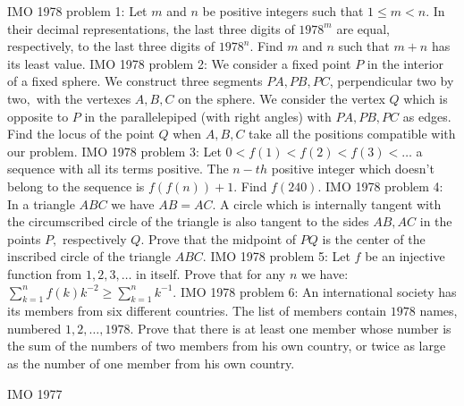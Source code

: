 IMO 1978 problem 1:  Let $ m$ and $ n$ be positive integers such that $ 1 \le m < n$.  In their decimal representations, the last three digits of $ 1978^m$ are equal, respectively, to the last three digits of $ 1978^n$.  Find $ m$ and $ n$ such that $ m + n$ has its least value. 
IMO 1978 problem 2:  We consider a fixed point $P$ in the interior of a fixed sphere$.$ We construct three segments $PA, PB,PC$, perpendicular two by two$,$ with the vertexes $A, B, C$ on the sphere$.$ We consider the vertex $Q$ which is opposite to $P$ in the parallelepiped (with right angles) with $PA, PB, PC$ as edges$.$ Find the locus of the point $Q$ when $A, B, C$ take all the positions compatible with our problem. 
IMO 1978 problem 3:  Let $0<f(1)<f(2)<f(3)<\ldots$ a sequence with all its terms positive$.$ The $n-th$ positive integer which doesn't belong to the sequence is $f(f(n))+1.$ Find $f(240).$ 
IMO 1978 problem 4:  In a triangle $ABC$ we have $AB = AC.$ A circle which is internally tangent with the circumscribed circle of the triangle is also tangent to the sides $AB, AC$ in the points $P,$ respectively $Q.$ Prove that the midpoint of $PQ$ is the center of the inscribed circle of the triangle $ABC.$ 
IMO 1978 problem 5:  Let $f$ be an injective function from ${1,2,3,\ldots}$ in itself. Prove that for any $n$ we have: $\sum_{k=1}^n f(k)k^{-2} \geq \sum_{k=1}^n k^{-1}.$ 
IMO 1978 problem 6:  An international society has its members from six different countries.  The list of members contain $1978$ names, numbered $1, 2, \dots, 1978$.  Prove that there is at least one member whose number is the sum of the numbers of two members from his own country, or twice as large as the number of one member from his own country. 

IMO 1977 


